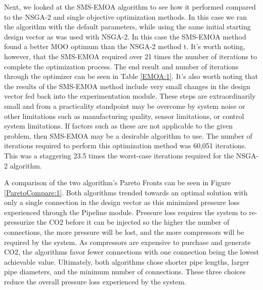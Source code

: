 \documentclass[balance,upint,subscriptcorrection,varvw,mathalfa=cal=boondoxo,spanish,french,vietnamese,russian,greek,pdf-a,colorlinks]{asmeconf}
\begin{document}
Next, we looked at the SMS-EMOA algorithm to see how it performed compared to the NSGA-2 and single objective optimization methods. In this case we ran the algorithm with the default parameters, while using the same initial starting design vector as was used with NSGA-2. In this case the SMS-EMOA method found a better MOO optimum than the NSGA-2 method t. It's worth noting, however, that the SMS-EMOA required over 21 times the number of iterations to complete the optimization process. The end result and number of iterations through the optimizer can be seen in Table \ref{EMOA:1}. It's also worth noting that the results of the SMS-EMOA method include very small changes in the design vector fed back into the experimentation module. These steps are extraordinarily small and from a practicality standpoint may be overcome by system noise or other limitations such as manufacturing quality, sensor limitations, or control system limitations. If factors such as these are not applicable to the given problem, then SMS-EMOA may be a desirable algorithm to use. The number of iterations required to perform this optimization method was 60,051 iterations. This was a staggering 23.5 times the worst-case iterations required for the NSGA-2 algorithm.   

A comparison of the two algorithm's Pareto Fronts can be seen in Figure \ref{ParetoCompare:1}.  Both algorithms trended towards an optimal solution with only a single connection in the design vector as this minimized pressure loss experienced through the Pipeline module. Pressure loss requires the system to re-pressurize the CO2 before it can be injected so the higher the number of connections, the more pressure will be lost, and the more compressors will be required by the system.  As compressors are expensive to purchase and generate CO2, the algorithms favor fewer connections with one connection being the lowest achievable value.  Ultimately, both algorithms chose shorter pipe lengths, larger pipe diameters, and the minimum number of connections.  These three choices reduce the overall pressure loss experienced by the system.  


\end{document}
